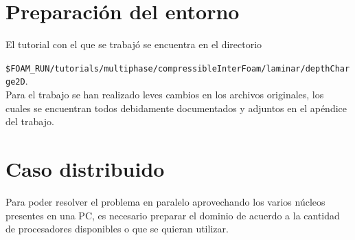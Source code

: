 \documentclass{article}
\begin{document}
\newpage
\section{Preparación del entorno}
El tutorial con el que se trabajó se encuentra en el directorio 

\texttt{\$FOAM\_RUN/tutorials/multiphase/compressibleInterFoam/laminar/depthCharge2D}.\\

Para el trabajo se han realizado leves cambios en los archivos originales, los cuales se encuentran todos debidamente documentados y adjuntos en el apéndice del trabajo.

\section{Caso distribuido}
Para poder resolver el problema en paralelo aprovechando los varios núcleos presentes en una PC, es necesario preparar el dominio de acuerdo a la cantidad de procesadores disponibles o que se quieran utilizar.\\
\end{document}
